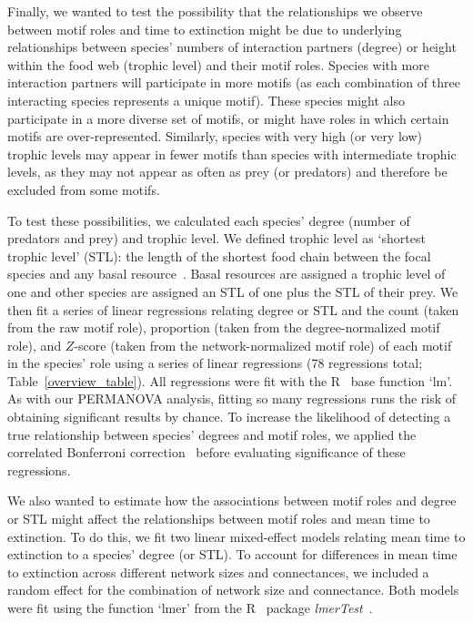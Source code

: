 \documentclass[12pt]{article}
\begin{document}
\begin{spacing}{2.0}
			Finally, we wanted to test the possibility that the relationships we observe between motif roles and time to extinction might be due to underlying relationships between species' numbers of interaction partners (degree) or height within the food web (trophic level) and their motif roles.
			Species with more interaction partners will participate in more motifs (as each combination of three interacting species represents a unique motif).
			These species might also participate in a more diverse set of motifs, or might have roles in which certain motifs are over-represented.
			Similarly, species with very high (or very low) trophic levels may appear in fewer motifs than species with intermediate trophic levels, as they may not appear as often as prey (or predators) and therefore be excluded from some motifs.
			
			
			To test these possibilities, we calculated each species' degree (number of predators and prey) and trophic level. We defined trophic level as `shortest trophic level' (STL): the length of the shortest food chain between the focal species and any basal resource~\citep{Hairston1993}. Basal resources are assigned a trophic level of one and other species are assigned an STL of one plus the STL of their prey.
			We then fit a series of linear regressions relating degree or STL and the count (taken from the raw motif role), proportion (taken from the degree-normalized motif role), and $Z$-score (taken from the network-normalized motif role) of each motif in the species' role using a series of linear regressions (78 regressions total; Table~\ref{overview_table}).
			All regressions were fit with the R~\citep{R} base function `lm'.
        	As with our PERMANOVA analysis, fitting so many regressions runs the risk of obtaining significant results by chance.
			To increase the likelihood of detecting a true relationship between species' degrees and motif roles, we applied the correlated Bonferroni correction~\citep{Drezner2016} before evaluating significance of these regressions.


            We also wanted to estimate how the associations between motif roles and degree or STL might affect the relationships between motif roles and mean time to extinction.
            To do this, we fit two linear mixed-effect models relating mean time to extinction to a species' degree (or STL). 
            To account for differences in mean time to extinction across different network sizes and connectances, we included a random effect for the combination of network size and connectance. 
            Both models were fit using the function `lmer' from the R~\citep{R} package \emph{lmerTest}~\citep{lmerTest}.



\end{spacing}
\end{document}
